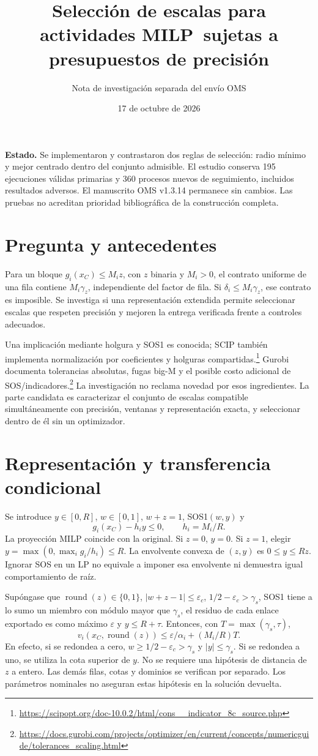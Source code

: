 \documentclass[10pt,a4paper]{article}
\title{Selección de escalas para actividades MILP\ sujetas a presupuestos de precisión}
\author{Nota de investigación separada del envío OMS}
\date{17 de octubre de 2026}
\begin{document}
\maketitle
\noindent\textbf{Estado.} Se implementaron y contrastaron dos reglas de selección:
radio mínimo y mejor centrado dentro del conjunto admisible. El estudio conserva
195 ejecuciones válidas primarias y 360 procesos nuevos de seguimiento, incluidos
resultados adversos. El manuscrito OMS v1.3.14 permanece sin cambios. Las pruebas
no acreditan prioridad bibliográfica de la construcción completa.

\section{Pregunta y antecedentes}
Para un bloque $g_i(x_C)\le M_i z$, con $z$ binaria y $M_i>0$, el contrato
uniforme de una fila contiene $M_i\gamma_z$, independiente del factor de fila.
Si $\delta_i\le M_i\gamma_z$, ese contrato es imposible. Se investiga si una
representación extendida permite seleccionar escalas que respeten precisión y
mejoren la entrega verificada frente a controles adecuados.

Una implicación mediante holgura y SOS1 es conocida; SCIP también implementa
normalización por coeficientes y holguras compartidas.\footnote{\url{https://scipopt.org/doc-10.0.2/html/cons__indicator_8c_source.php}}
Gurobi documenta tolerancias absolutas, fugas big-M y el posible costo adicional
de SOS/indicadores.\footnote{\url{https://docs.gurobi.com/projects/optimizer/en/current/concepts/numericguide/tolerances_scaling.html}}
La investigación no reclama novedad por esos ingredientes. La parte candidata
es caracterizar el conjunto de escalas compatible simultáneamente con precisión,
ventanas y representación exacta, y seleccionar dentro de él sin un optimizador.

\section{Representación y transferencia condicional}
Se introduce $y\in[0,R]$, $w\in[0,1]$, $w+z=1$, SOS1$(w,y)$ y
\[
 g_i(x_C)-h_i y\le0,\qquad h_i=M_i/R.
\]
La proyección MILP coincide con la original. Si $z=0$, $y=0$. Si $z=1$,
elegir $y=\max(0,\max_i g_i/h_i)\le R$.
La envolvente convexa de $(z,y)$ es $0\le y\le Rz$. Ignorar SOS en un LP
no equivale a imponer esa envolvente ni demuestra igual comportamiento de raíz.

Supóngase que $\operatorname{round}(z)\in\{0,1\}$,
$|w+z-1|\le\varepsilon_c$, $1/2-\varepsilon_c>\gamma_s$,
SOS1 tiene a lo sumo un miembro con módulo mayor que $\gamma_s$,
el residuo de cada enlace exportado es como máximo $\varepsilon$ y
$y\le R+\tau$. Entonces, con $T=\max(\gamma_s,\tau)$,
\[
 v_i(x_C,\operatorname{round}(z))\le
 \varepsilon/\alpha_i+(M_i/R)T.
\]
En efecto, si se redondea a cero, $w\ge1/2-\varepsilon_c>\gamma_s$ y
$|y|\le\gamma_s$. Si se redondea a uno, se utiliza la cota superior de $y$.
No se requiere una hipótesis de distancia de $z$ a entero. Las demás filas,
cotas y dominios se verifican por separado. Los parámetros nominales no
aseguran estas hipótesis en la solución devuelta.
\end{document}
